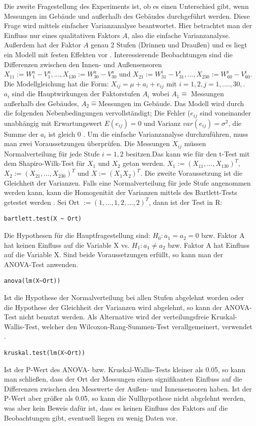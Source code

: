 \documentclass[ ngerman, fontsize= 12pt, paper=a4, headings=big, titlepage=true]{article}
\begin{document}
Die zweite Fragestellung des Experiments ist, ob es einen Unterschied gibt, wenn Messungen im Gebäude und außerhalb des Gebäudes durchgeführt werden. Diese Frage wird mittels einfacher Varianzanalyse beantwortet. Hier betrachtet man der Einfluss nur eines qualitativen Faktors $A $, also die einfache Varianzanalyse. Außerdem hat der Faktor $A $ genau 2 Stufen (Drinnen und Draußen) und es liegt ein Modell mit festen Effekten vor \cite{3}. Interessierende Beobachtungen sind  die Differenzen zwischen den Innen- und Außensensoren $X_{11} := W^a_1 - V^a_1, ..., X_{1 30} := W^a_{30} - V^a_{30} $ und $X_{21} := W^i_{31} - V^i_{31}, ..., X_{2 30} := W^i_{60} - V^i_{60}  $. \\ Die Modellgleichung hat die Form: $ X_{ij} = \mu + a_i + e_{ij}  $ mit $ i = 1, 2, j = 1,...., 30, $. $a_i $ sind die Hauptwirkungen der Faktorstufen $A_i $ wobei $ A_1 \hat{=} $ Messungen außerhalb des Gebäudes, $ A_2 \hat{=} $Messungen im Gebäude. Das Modell wird durch die folgenden Nebenbedingungen vervollständigt; Die Fehler ($e_{ij} $ sind voneinander unabhängig mit Erwartungswert $E(e_{ij}) = 0 $ und Varianz $var(e_{ij} ) = \sigma^2 $, die Summe der $a_i $ ist gleich 0 \cite{3}. Um die einfache Varianzanalyse durchzuführen, muss man zwei Voraussetzungen überprüfen. Die Messungen $X_{ij} $  müssen Normalverteilung für jede Stufe $i = 1, 2 $ besitzen.Das kann wie für den t-Test mit dem Shapiro-Wilk-Test für $X_1 $ und $X_2 $ getan werden. $X_1 := (X_{11}, ..., X_{1 30})^T $, $ X_2 := (X_{21}, ..., X_{2 30})^T $ und $X := (X_1 X_2)^T $. Die zweite Voraussetzung ist die Gleichheit der Varianzen. Falls eine Normalverteilung für jede Stufe angenommen werden kann, kann die Homogenität der Varianzen mittels des Bartlett-Tests getestet werden  \cite{4}. Sei Ort $:= (1,...,1,2,...,2)^T $, dann ist der Test in R: \begin{lstlisting}
bartlett.test(X ~ Ort)
\end{lstlisting}
Die Hypothesen für die Hauptfragestellung sind: $ H_0: a_1 = a_2 = 0 $ bzw. Faktor A hat keinen Einfluss auf die Variable X  vs.  $H_1: a_1 \neq a_2 $ bzw. Faktor A hat Einfluss auf die Variable X. Sind beide Voraussetzungen erfüllt, so kann man der ANOVA-Test anwenden.\begin{lstlisting}
anova(lm(X~Ort))
\end{lstlisting}  
Ist die Hypothese der Normalverteilung bei allen Stufen abgelehnt worden oder die Hypothese der Gleichheit der Varianzen wird abgelehnt, so kann der ANOVA-Test nicht benutzt werden. Als Alternative wird der verteilungsfreie Kruskal-Wallis-Test, welcher den Wilcoxon-Rang-Summen-Test verallgemeinert, verwendet \cite{4}.
\begin{lstlisting}
kruskal.test(lm(X~Ort))
\end{lstlisting}
Ist der P-Wert des ANOVA- bzw. Kruskal-Wallis-Tests kleiner als 0.05, so kann man schließen, dass der Ort der Messungen einen signifikanten Einfluss auf die Differenzen zwischen den Messwerte der Außen- und Innensensoren haben. Ist der P-Wert aber größer als 0.05, so kann die Nullhypothese nicht abgelehnt werden, was aber kein Beweis dafür ist, dass es keinen Einfluss des Faktors auf die Beobachtungen gibt, eventuell liegen zu wenig Daten vor.
\end{document}
